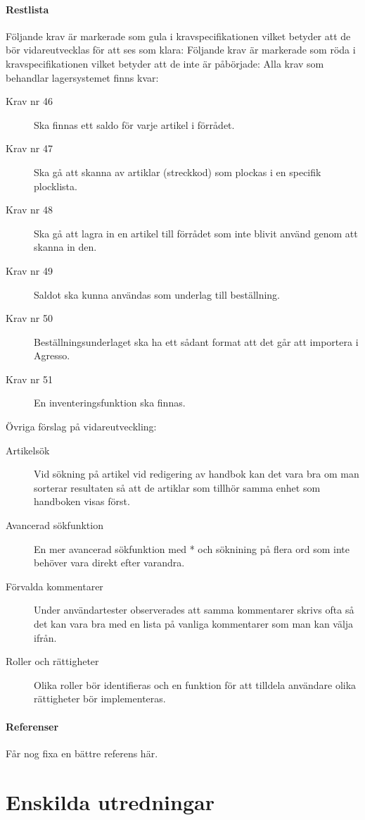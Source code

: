 \documentclass{article}
\begin{document}
\subsection{Restlista}
Följande krav är markerade som gula i kravspecifikationen vilket betyder att de bör vidareutvecklas för att ses som klara:
Följande krav är markerade som röda i kravspecifikationen vilket betyder att de inte är påbörjade:
Alla krav som behandlar lagersystemet finns kvar:
\begin{description}
\item[Krav nr 46] Ska finnas ett saldo för varje artikel i förrådet.
\item[Krav nr 47] Ska gå att skanna av artiklar (streckkod) som plockas i en specifik plocklista.
\item[Krav nr 48] Ska gå att lagra in en artikel till förrådet som inte blivit använd genom att skanna in den.
\item[Krav nr 49] Saldot ska kunna användas som underlag till beställning.
\item[Krav nr 50] Beställningsunderlaget ska ha ett sådant format att det går att importera i Agresso.
\item[Krav nr 51] En inventeringsfunktion ska finnas.
\end{description}

Övriga förslag på vidareutveckling:


\begin{description}
\item[Artikelsök] Vid sökning på artikel vid redigering av handbok kan det vara bra om man sorterar resultaten så att de artiklar som tillhör samma enhet som handboken visas först.
\item[Avancerad sökfunktion] En mer avancerad sökfunktion med * och söknining på flera ord som inte behöver vara direkt efter varandra.
\item[Förvalda kommentarer] Under användartester observerades att samma kommentarer skrivs ofta så det kan vara bra med en lista på vanliga kommentarer som man kan välja ifrån.
\item[Roller och rättigheter] Olika roller bör identifieras och en funktion för att tilldela användare olika rättigheter bör implementeras.
\end{description}
\subsection{Referenser}
\begin{thebibliography}{9}
Får nog fixa en bättre referens här.
\end{thebibliography}

\newpage
\part{Enskilda utredningar}
\renewcommand{\thesection}{\Alph{section}}	

\newpage

\newpage

\newpage

\newpage

\newpage

\newpage

\end{document}
